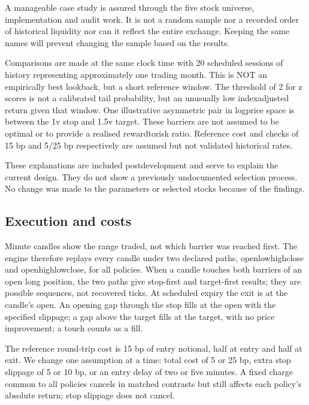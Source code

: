 \documentclass[11pt,a4paper]{article}
\begin{document}
A manageable case study is assured through the five stock universe, implementation and audit work. It is not a random sample nor a recorded order of historical liquidity nor can it reflect the entire exchange. Keeping the same names will prevent changing the sample based on the results.

Comparisons are made at the same clock time with 20 scheduled sessions of history representing approximately one trading month. This is NOT an empirically best lookback, but a short reference window. The threshold of \allowbreak{}2 for z scores is not a calibrated tail probability, but an unusually low index\allowbreak{}adjusted return given that window. One illustrative asymmetric pair in log\allowbreak{}price space is between the 1v stop and 1.5v target. These barriers are not assumed to be optimal or to provide a realised reward\allowbreak{}to\allowbreak{}risk ratio. Reference cost and checks of 15 bp and 5/25 bp respectively are assumed but not validated historical rates.

These explanations are included post\allowbreak{}development and serve to explain the current design. They do not show a previously undocumented selection process. No change was made to the parameters or selected stocks because of the findings.

\subsection*{Execution and costs}

Minute candles show the range traded, not which barrier was reached first. The engine therefore replays every candle under two declared paths, open\allowbreak{}low\allowbreak{}high\allowbreak{}close and open\allowbreak{}high\allowbreak{}low\allowbreak{}close, for all policies. When a candle touches both barriers of an open long position, the two paths give stop-first and target-first results; they are possible sequences, not recovered ticks. At scheduled expiry the exit is at the candle's open. An opening gap through the stop fills at the open with the specified slippage; a gap above the target fills at the target, with no price improvement; a touch counts as a fill.

The reference round-trip cost is 15 bp of entry notional, half at entry and half at exit. We change one assumption at a time: total cost of 5 or 25 bp, extra stop slippage of 5 or 10 bp, or an entry delay of two or five minutes. A fixed charge common to all policies cancels in matched contrasts but still affects each policy's absolute return; stop slippage does not cancel.
\end{document}
